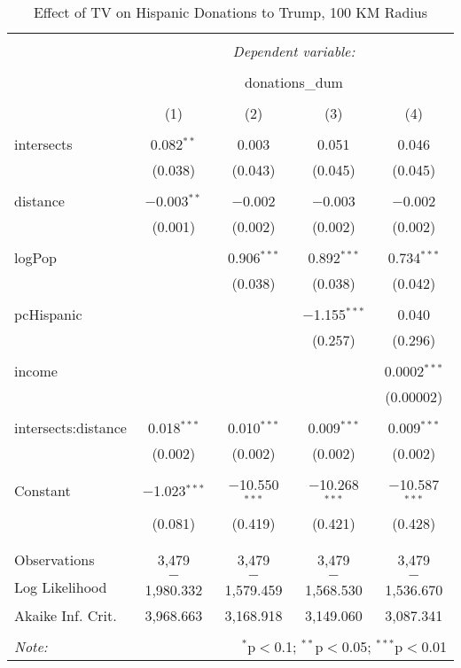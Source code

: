 
\begin{table}[!htbp] \centering 
  \caption{Effect of TV on Hispanic Donations to Trump, 100 KM Radius} 
  \label{} 
\begin{tabular}{@{\extracolsep{-5pt}}lcccc} 
\\[-1.8ex]\hline 
\hline \\[-1.8ex] 
 & \multicolumn{4}{c}{\textit{Dependent variable:}} \\ 
\cline{2-5} 
\\[-1.8ex] & \multicolumn{4}{c}{donations\_dum} \\ 
\\[-1.8ex] & (1) & (2) & (3) & (4)\\ 
\hline \\[-1.8ex] 
 intersects & 0.082$^{**}$ & 0.003 & 0.051 & 0.046 \\ 
  & (0.038) & (0.043) & (0.045) & (0.045) \\ 
  & & & & \\ 
 distance & $-$0.003$^{**}$ & $-$0.002 & $-$0.003 & $-$0.002 \\ 
  & (0.001) & (0.002) & (0.002) & (0.002) \\ 
  & & & & \\ 
 logPop &  & 0.906$^{***}$ & 0.892$^{***}$ & 0.734$^{***}$ \\ 
  &  & (0.038) & (0.038) & (0.042) \\ 
  & & & & \\ 
 pcHispanic &  &  & $-$1.155$^{***}$ & 0.040 \\ 
  &  &  & (0.257) & (0.296) \\ 
  & & & & \\ 
 income &  &  &  & 0.0002$^{***}$ \\ 
  &  &  &  & (0.00002) \\ 
  & & & & \\ 
 intersects:distance & 0.018$^{***}$ & 0.010$^{***}$ & 0.009$^{***}$ & 0.009$^{***}$ \\ 
  & (0.002) & (0.002) & (0.002) & (0.002) \\ 
  & & & & \\ 
 Constant & $-$1.023$^{***}$ & $-$10.550$^{***}$ & $-$10.268$^{***}$ & $-$10.587$^{***}$ \\ 
  & (0.081) & (0.419) & (0.421) & (0.428) \\ 
  & & & & \\ 
\hline \\[-1.8ex] 
Observations & 3,479 & 3,479 & 3,479 & 3,479 \\ 
Log Likelihood & $-$1,980.332 & $-$1,579.459 & $-$1,568.530 & $-$1,536.670 \\ 
Akaike Inf. Crit. & 3,968.663 & 3,168.918 & 3,149.060 & 3,087.341 \\ 
\hline 
\hline \\[-1.8ex] 
\textit{Note:}  & \multicolumn{4}{r}{$^{*}$p$<$0.1; $^{**}$p$<$0.05; $^{***}$p$<$0.01} \\ 
\end{tabular} 
\end{table} 
